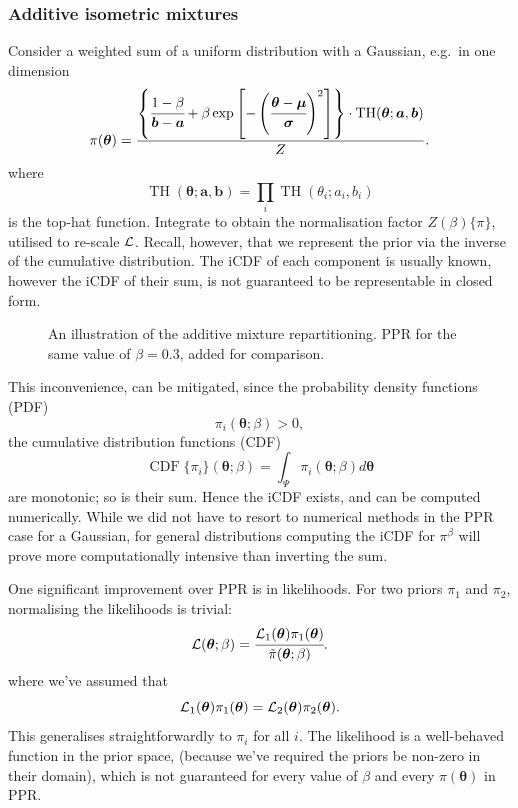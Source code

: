 \documentclass[usenatbib]{mnras}
\DeclareMathOperator{\TopHat}{TH}
\DeclareMathOperator{\CDF}{CDF}
\begin{document}
\subsubsection{Additive isometric mixtures}\label{sec:org418133f}
Consider a weighted sum of a uniform distribution with
a Gaussian, e.g.~in one dimension
\begin{equation}\label{eq:additive-mix}
  \pi(\bm{\theta}) = \frac{ \left\lbrace \cfrac{1- \beta} {\bm{b} - \bm{a}} + \beta \exp \left[ -\left(\cfrac{\bm{\theta} - \bm{\mu}}{\bm{\sigma}} \right)^{2}\right]\right\rbrace \cdot \TopHat(\bm{\theta}; \bm{a}, \bm{b})}{Z}.
\end{equation}
where \[\TopHat(\bm{\theta};\bm{a},\bm{b}) = \prod_{i}
	\TopHat(\theta_{i}; a_{i}, b_{i})\] is the top-hat function. Integrate
to obtain the normalisation factor \(Z(\beta)\{\pi\}\), utilised
to re-scale \({\cal L}\). Recall, however, that we represent the
prior via the inverse of the cumulative distribution. The iCDF of
each component is usually known, however the iCDF of their sum, is
not guaranteed to be representable in closed form.

\begin{figure}
  
\caption{\label{orgda3e5e9}
An illustration of the additive mixture repartitioning. PPR for the same value of \(\beta=0.3\), added for comparison.}
\end{figure}

This inconvenience, can be mitigated, since the probability
density functions (PDF) \[\pi_{i}(\bm{\theta}; \beta) >0,\] the
cumulative distribution functions (CDF)
\[\CDF\{\pi_{i}\}(\bm{\theta};\beta) = \int_{\Psi}
	\pi_{i}(\bm{\theta}; \beta)d\bm{\theta}\] are monotonic;
so is their sum. Hence the iCDF exists, and can be computed
numerically. While we did not have to resort to numerical methods
in the PPR case for a Gaussian, for general distributions
computing the iCDF for \(\pi^{\beta}\) will prove more
computationally intensive than inverting the sum.

One significant improvement over PPR is in likelihoods. For two
priors \(\pi_{1}\) and \(\pi_{2}\), normalising the likelihoods is
trivial:
\begin{equation*}
{\cal L}(\bm{\theta}; \beta) = \cfrac{{\cal L}_{1}(\bm{\theta}) \pi_{1}(\bm{\theta})}{\tilde{\pi}(\bm{\theta}; \beta)}.
\end{equation*}
where we've assumed that \[{\cal L}_{1}(\bm{\theta})\pi_{1}(\bm{\theta})
	={\cal L}_{2}(\bm{\theta}) \pi_{2}(\bm{\theta}).\] This generalises
straightforwardly to \(\pi_{i}\) for all \(i\). The likelihood is a
well-behaved function in the prior space, (because we've required
the priors be non-zero in their domain), which is not guaranteed
for every value of \(\beta\) and every \(\pi(\bm{\theta})\) in PPR.
\end{document}
